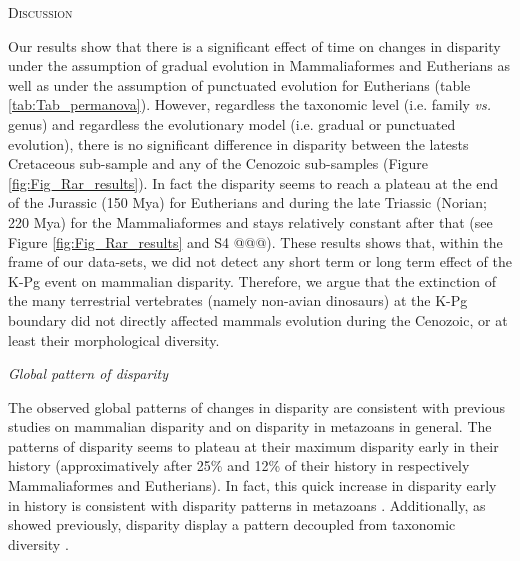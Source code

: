 \documentclass[12pt,letterpaper]{article}
\renewcommand{\section}[1]{%
\bigskip
\begin{center}
\begin{Large}
\normalfont\scshape #1
\medskip
\end{Large}
\end{center}}
\renewcommand{\subsection}[1]{%
\bigskip
\begin{center}
\begin{large}
\normalfont\itshape #1
\end{large}
\end{center}}
\begin{document}
\section{Discussion}
Our results show that there is a significant effect of time on changes in disparity under the assumption of gradual evolution in Mammaliaformes and Eutherians as well as under the assumption of punctuated evolution for Eutherians (table \ref{tab:Tab_permanova}).
However, regardless the taxonomic level (i.e. family \textit{vs.} genus) and regardless the evolutionary model (i.e. gradual or punctuated evolution), there is no significant difference in disparity between the latests Cretaceous sub-sample and any of the Cenozoic sub-samples (Figure \ref{fig:Fig_Rar_results}).
In fact the disparity seems to reach a plateau at the end of the Jurassic (150 Mya) for Eutherians and during the late Triassic (Norian; 220 Mya) for the Mammaliaformes and stays relatively constant after that (see Figure \ref{fig:Fig_Rar_results} and S4 @@@).
These results shows that, within the frame of our data-sets, we did not detect any short term or long term effect of the K-Pg event on mammalian disparity.
Therefore, we argue that the extinction of the many terrestrial vertebrates (namely non-avian dinosaurs) at the K-Pg boundary did not directly affected mammals evolution during the Cenozoic, or at least their morphological diversity.

\subsection{Global pattern of disparity} %
The observed global patterns of changes in disparity are consistent with previous studies on mammalian disparity and on disparity in metazoans in general.
The patterns of disparity seems to plateau at their maximum disparity early in their history (approximatively after 25\% and 12\% of their history in respectively Mammaliaformes and Eutherians).
In fact, this quick increase in disparity early in history is consistent with disparity patterns in metazoans \citep{Hughes20082013}.
Additionally, as showed previously, disparity display a pattern decoupled from taxonomic diversity \citep{slaterCetacean,ruta2013,hopkinsdecoupling2013}.
\end{document}

